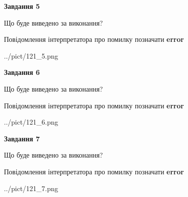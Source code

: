 \documentclass[10pt, ukrainian]{article}
\begin{document}
{\begin {large}
{\begin {center}\textbf{Завдання 5}\end {center}}\par
Що буде виведено за виконання? \par
Повідомлення інтерпретатора про помилку позначати \textbf{error}

\begin{center}
	{../pict/121_5.png}
\end{center}
\newpage

{\begin {center}\textbf{Завдання 6}\end {center}}\par
Що буде виведено за виконання? \par
Повідомлення інтерпретатора про помилку позначати \textbf{error}

\begin{center}
	{../pict/121_6.png}
\end{center}
\newpage

{\begin {center}\textbf{Завдання 7}\end {center}}\par
Що буде виведено за виконання? \par
Повідомлення інтерпретатора про помилку позначати \textbf{error}

\begin{center}
	{../pict/121_7.png}
\end{center}
\newpage

\end {large}}
\end{document}
